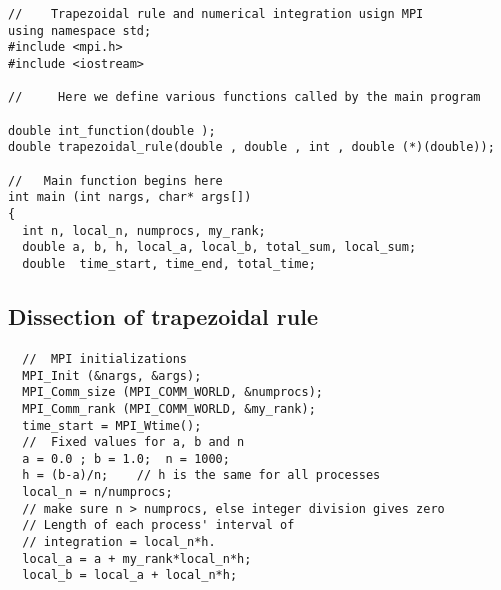 \documentclass[%
oneside,                 %
final,                   %
10pt]{article}
\begin{document}
\begin{verbatim}
//    Trapezoidal rule and numerical integration usign MPI
using namespace std;
#include <mpi.h>
#include <iostream>

//     Here we define various functions called by the main program

double int_function(double );
double trapezoidal_rule(double , double , int , double (*)(double));

//   Main function begins here
int main (int nargs, char* args[])
{
  int n, local_n, numprocs, my_rank; 
  double a, b, h, local_a, local_b, total_sum, local_sum;   
  double  time_start, time_end, total_time;

\end{verbatim}



\subsection*{Dissection of trapezoidal rule}

\paragraph{}
















\begin{verbatim}
  //  MPI initializations
  MPI_Init (&nargs, &args);
  MPI_Comm_size (MPI_COMM_WORLD, &numprocs);
  MPI_Comm_rank (MPI_COMM_WORLD, &my_rank);
  time_start = MPI_Wtime();
  //  Fixed values for a, b and n 
  a = 0.0 ; b = 1.0;  n = 1000;
  h = (b-a)/n;    // h is the same for all processes 
  local_n = n/numprocs;  
  // make sure n > numprocs, else integer division gives zero
  // Length of each process' interval of
  // integration = local_n*h.  
  local_a = a + my_rank*local_n*h;
  local_b = local_a + local_n*h;

\end{verbatim}
\end{document}
